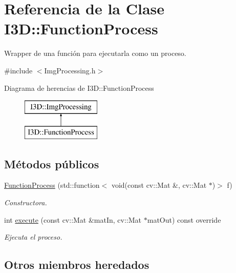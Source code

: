 \hypertarget{class_i3_d_1_1_function_process}{}\section{Referencia de la Clase I3D\+:\+:Function\+Process}
\label{class_i3_d_1_1_function_process}


Wrapper de una función para ejecutarla como un proceso.  




{\ttfamily \#include $<$Img\+Processing.\+h$>$}

Diagrama de herencias de I3D\+:\+:Function\+Process\begin{figure}[H]
\begin{center}
\leavevmode
\includegraphics[height=2.000000cm]{class_i3_d_1_1_function_process}
\end{center}
\end{figure}
\subsection*{Métodos públicos}
\begin{DoxyCompactItemize}
\item 
\hyperlink{class_i3_d_1_1_function_process_ae88e4f43dbad5a24dddcbc76811f454f}{Function\+Process} (std\+::function$<$ void(const cv\+::\+Mat \&, cv\+::\+Mat $\ast$)$>$ f)
\begin{DoxyCompactList}\small\item\em Constructora. \end{DoxyCompactList}\item 
int \hyperlink{class_i3_d_1_1_function_process_aa321eb93219271fa3f841538b61133c3}{execute} (const cv\+::\+Mat \&mat\+In, cv\+::\+Mat $\ast$mat\+Out) const  override
\begin{DoxyCompactList}\small\item\em Ejecuta el proceso. \end{DoxyCompactList}\end{DoxyCompactItemize}
\subsection*{Otros miembros heredados}


